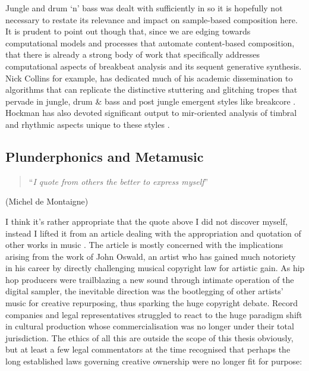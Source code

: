 Jungle and drum `n' bass was dealt with sufficiently in  so it is hopefully not necessary to restate its relevance and impact on sample-based composition here. It is prudent to point out though that, since we are edging towards computational models and processes that automate content-based composition, that there is already a strong body of work that specifically addresses computational aspects of breakbeat analysis and its sequent generative synthesis. Nick Collins for example, has dedicated much of his academic dissemination to algorithms that can replicate the distinctive stuttering and glitching tropes that pervade in jungle, drum \& bass and post jungle emergent styles like breakcore \citep{Collins2001, Collins2002, Collins2006a}. Hockman has also devoted significant output to \acrshort{mir}-oriented analysis of timbral and rhythmic aspects unique to these styles \citep{Hockman2007, Hockman2012, Hockman2015}.

\subsection{Plunderphonics and Metamusic}

\blockquote{``\textit{I quote from others the better to express myself}''}

\begin{flushright}
(Michel de Montaigne)
\end{flushright}

I think it's rather appropriate that the quote above I did not discover myself, instead I lifted it from an article dealing with the appropriation and quotation of other works in music \citep{Holm-Hudson1997}. The article is mostly concerned with the implications arising from the work of John Oswald, an artist who has gained much notoriety in his career by directly challenging musical copyright law for artistic gain. As hip hop producers were trailblazing a new sound through intimate operation of the digital sampler, the inevitable direction was the bootlegging of other artists' music for creative repurposing, thus sparking the huge copyright debate. Record companies and legal representatives struggled to react to the huge paradigm shift in cultural production whose commercialisation was no longer under their total jurisdiction. The ethics of all this are outside the scope of this thesis obviously, but at least a few legal commentators at the time recognised that perhaps the long established laws governing creative ownership were no longer fit for purpose:

